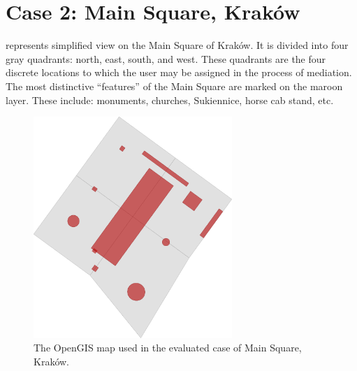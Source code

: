 \section{Case 2: Main Square, Kraków}
\label{sec:case-cracow-square}



 represents simplified view on the Main Square of Kraków. It is divided into four gray quadrants: north, east, south, and west. These quadrants are the four discrete locations to which the user may be assigned in the process of mediation. The most distinctive ``features'' of the Main Square are marked on the maroon layer. These include: monuments, churches, Sukiennice, horse cab stand, etc.

\begin{figure}[h]
	\centering
	\includegraphics[width=0.67\textwidth]{case-cracow}
	\caption{The OpenGIS map used in the evaluated case of Main Square, Kraków.}
	\label{fig:case-cracow}
\end{figure}


